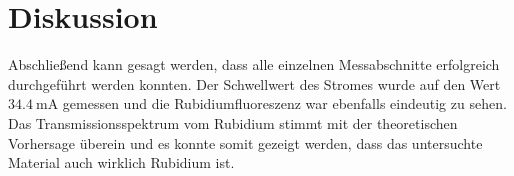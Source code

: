 \section{Diskussion}
\label{sec:Diskussion}

Abschließend kann gesagt werden, dass alle einzelnen Messabschnitte erfolgreich durchgeführt werden konnten. Der Schwellwert des Stromes wurde auf den Wert
$\SI{34.4}{\milli\ampere}$ gemessen und die Rubidiumfluoreszenz war ebenfalls eindeutig zu sehen.
Das Transmissionsspektrum vom Rubidium stimmt mit der theoretischen Vorhersage überein und es konnte somit gezeigt werden, dass das untersuchte Material auch
wirklich Rubidium ist.